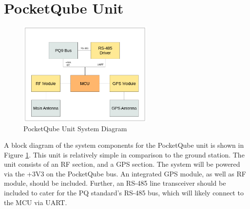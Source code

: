 \graphicspath{{./figures}}

\section{PocketQube Unit}

\begin{figure}[!htb]
  \centering
  \includegraphics[width=0.6\textwidth]{pqunit_system}
  \caption{PocketQube Unit System Diagram}
  \label{fig:pqunit_system}
\end{figure}

A block diagram of the system components for the PocketQube unit is shown in Figure \ref{fig:pqunit_system}. This unit is relatively simple in comparison to the ground station. The unit consists of an RF section, and a GPS section. The system will be powered via the +3V3 on the PocketQube bus. An integrated GPS module, as well as RF module, should be included. Further, an RS-485 line transceiver should be included to cater for the PQ standard's RS-485 bus, which will likely connect to the MCU via UART.